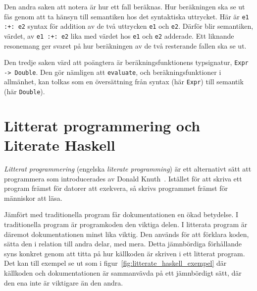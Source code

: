 Den andra saken att notera är hur ett fall
beräknas. Hur beräkningen ska se ut fås genom att ta hänsyn till
semantiken hos det syntaktiska uttrycket. Här är \texttt{e1 :+: e2} syntax för
addition av de två uttrycken \texttt{e1} och \texttt{e2}. Därför blir
semantiken, värdet, av \texttt{e1 :+: e2} lika med värdet hos \texttt{e1} och
\texttt{e2} adderade. Ett liknande resonemang ger svaret på hur beräkningen av
de två resterande fallen ska se ut.

Den tredje saken värd att poängtera är beräkningsfunktionens
typsignatur, \texttt{Expr -> Double}. Den gör nämligen att
\texttt{evaluate}, och beräkningsfunktioner i allmänhet, kan tolkas som en översättning
från syntax (här \texttt{Expr}) till semantik (här \texttt{Double}).

\section{Litterat programmering och Literate Haskell}\label{sec:lhs}

\textit{Litterat programmering} (engelska \textit{literate programming}) är ett
alternativt sätt att programmera som introducerades av Donald Knuth~\cite{knuth}.
Istället för att skriva ett program främst för datorer att exekvera, så skrivs
programmet främst för människor att läsa.

Jämfört med traditionella program får dokumentationen en
ökad betydelse. I traditionella program är programkoden den viktiga delen. I
litterata program är däremot dokumentationen minst lika viktig. Den används för
att förklara koden, sätta den i relation till andra delar, med mera.
Detta jämnbördiga förhållande syns konkret genom att titta på hur källkoden är
skriven i ett litterat program. Det kan till exempel se ut som i
figur~\ref{fig:litterate_haskell_exempel} där källkoden och
dokumentationen är sammanvävda på ett jämnbördigt sätt, där den ena inte är
viktigare än den andra.

